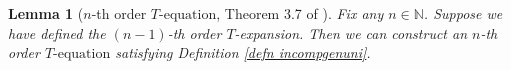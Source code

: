 \documentclass{article}
\newcommand{\1}{\mathds{1}}
\numberwithin{equation}{section}
\newcommand{\al}{\alpha}
\newcommand{\be}{\begin{equation}}
\newcommand{\ee}{\end{equation}}
\newcommand{\fb}{{\mathfrak b}}
\renewcommand{\leq}{\leqslant}
\renewcommand{\le}{\leq}
\newcommand{\N}{\mathbb{N}}
\newcommand{\selfs}{\text{self-energies}}
\DeclareMathOperator{\OO}{O}
\theoremstyle{plain} %
\newtheorem{lemma}[theorem]{Lemma}
\theoremstyle{remark}
\newcommand{\cob}{\color{purple}}
\newcommand{\wtSdelta}{\Sigma}
\newcommand{\wtSdeltan}{\Sigma^{(n)}}
\newcommand{\Sele}{{\mathcal E}}
\newcommand{\incomp}{{\text{$T$-equation}}}
\newcommand{\PTn}{\mathcal R_T^{(n)}}
\newcommand{\PITn}{{\mathcal R_{IT}^{(n)}}}
\newcommand{\QTn}{\mathcal Q_T^{(n)}}
\newcommand{\QITn}{{\mathcal Q_{IT}^{(n)}}}
\newcommand{\ATn}{\mathcal A_T^{(>n)}}
\newcommand{\AITn}{{\mathcal A_{IT}^{(>n)}}}
\begin{document}
\begin{lemma} [$n$-th order $\incomp$, Theorem 3.7 of \cite{PartII_high}]   \label{incomplete Texp} %
Fix any $n\in \N$. Suppose we have defined the $(n-1)$-th order $T$-expansion. Then we can construct an $n$-th order $\incomp$ satisfying Definition \ref{defn incompgenuni}.  
 \end{lemma} 






\end{document}

